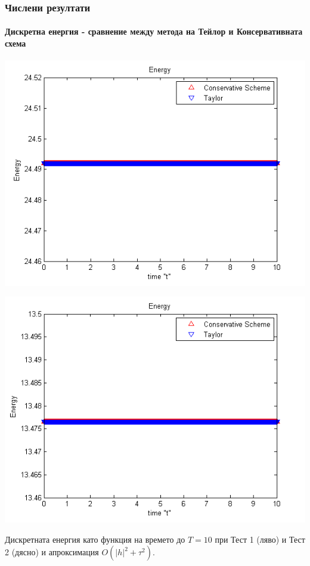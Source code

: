 \documentclass{beamer}
\begin{document}
\begin{frame}
\frametitle{Числени резултати}
\framesubtitle{Дискретна енергия - сравнение между метода на Тейлор и Консервативната схема}

\begin{center}\vspace{0.4cm}
	\begin{minipage}[b]{0.49\linewidth}
		\includegraphics[width=\linewidth]{../amitans/figures/Energy_bt3_c045_h005.png}
	\end{minipage}	
	\begin{minipage}[b]{0.49\linewidth}
		\includegraphics[width=\linewidth]{../amitans/figures/Energy_bt1_c090_h010.png}
		
	\end{minipage}
\end{center}
Дискретната енергия като функция на времето до $T = 10$ при Тест 1 (ляво) и Тест 2 (дясно) и апроксимация $O(|h|^2 + \tau^2)$.
\end{frame}
\end{document}
